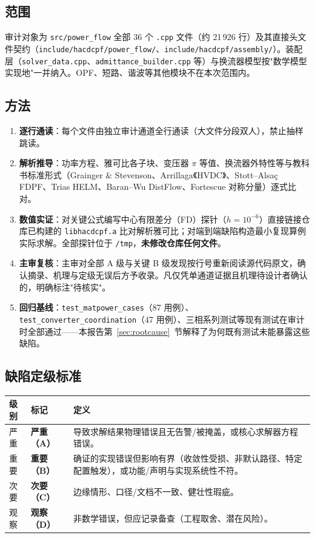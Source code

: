 \documentclass[11pt,a4paper,fontset=fandol]{ctexart}
\newcommand{\file}[1]{\texttt{#1}}
\newcommand{\sevA}{\textcolor{hyred}{\textbf{严重（A）}}}
\newcommand{\sevB}{\textcolor{hyorange}{\textbf{重要（B）}}}
\newcommand{\sevC}{\textcolor{hyblue}{\textbf{次要（C）}}}
\newcommand{\sevD}{\textcolor{hygray}{\textbf{观察（D）}}}
\begin{document}
\subsection{范围}

审计对象为 \file{src/power\_flow} 全部 36 个 \file{.cpp} 文件（约 21\,926 行）及其直接头文件契约（\file{include/hacdcpf/power\_flow/}、\file{include/hacdcpf/assembly/}）。装配层（\file{solver\_data.cpp}、\file{admittance\_builder.cpp} 等）与换流器模型按"数学模型实现地"一并纳入。OPF、短路、谐波等其他模块不在本次范围内。

\subsection{方法}

\begin{enumerate}
  \item \textbf{逐行通读}：每个文件由独立审计通道全行通读（大文件分段双人），禁止抽样跳读。
  \item \textbf{解析推导}：功率方程、雅可比各子块、变压器 $\pi$ 等值、换流器外特性等与教科书标准形式（Grainger \& Stevenson、Arrillaga《HVDC》、Stott--Alsa\c{c} FDPF、Trias HELM、Baran--Wu DistFlow、Fortescue 对称分量）逐式比对。
  \item \textbf{数值实证}：对关键公式编写中心有限差分（FD）探针（$h=10^{-6}$）直接链接仓库已构建的 \file{libhacdcpf.a} 比对解析雅可比；对端到端缺陷构造最小复现算例实际求解。全部探针位于 \file{/tmp}，\textbf{未修改仓库任何文件}。
  \item \textbf{主审复核}：主审对全部 A 级与关键 B 级发现按行号重新阅读源代码原文，确认摘录、机理与定级无误后方予收录。凡仅凭单通道证据且机理待设计者确认的，明确标注"待核实"。
  \item \textbf{回归基线}：\file{test\_matpower\_cases}（87 用例）、\file{test\_converter\_coordination}（47 用例）、三相系列测试等现有测试在审计时全部通过——本报告第~\ref{sec:rootcause}~节解释了为何既有测试未能暴露这些缺陷。
\end{enumerate}

\subsection{缺陷定级标准}

\begin{center}
\begin{tabular}{@{}llp{9.5cm}@{}}
\toprule
\textbf{级别} & \textbf{标记} & \textbf{定义}\\
\midrule
严重 & \sevA{} & 导致求解结果物理错误且无告警/被掩盖，或核心求解器方程错误。\\
重要 & \sevB{} & 确证的实现错误但影响有界（收敛性受损、非默认路径、特定配置触发），或功能/声明与实现系统性不符。\\
次要 & \sevC{} & 边缘情形、口径/文档不一致、健壮性瑕疵。\\
观察 & \sevD{} & 非数学错误，但应记录备查（工程取舍、潜在风险）。\\
\bottomrule
\end{tabular}
\end{center}
\end{document}
